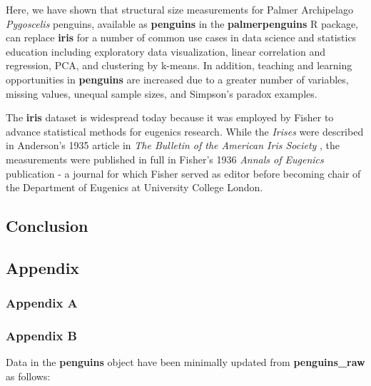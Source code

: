 Here, we have shown that structural size measurements for Palmer
Archipelago \emph{Pygoscelis} penguins, available as \textbf{penguins}
in the \textbf{palmerpenguins} R package, can replace \textbf{iris} for
a number of common use cases in data science and statistics education
including exploratory data visualization, linear correlation and
regression, PCA, and clustering by k-means. In addition, teaching and
learning opportunities in \textbf{penguins} are increased due to a
greater number of variables, missing values, unequal sample sizes, and
Simpson's paradox examples.

The \textbf{iris} dataset is widespread today because it was employed by
Fisher to advance statistical methods for eugenics research. While the
\emph{Irises} were described in Anderson's 1935 article in \emph{The
Bulletin of the American Iris Society} \citep{anderson_irises_1935}, the
measurements were published in full in Fisher's 1936 \emph{Annals of
Eugenics} publication \citep{fisher_use_1936} - a journal for which
Fisher served as editor before becoming chair of the Department of
Eugenics at University College London.

\hypertarget{conclusion}{%
\subsection{Conclusion}\label{conclusion}}

\hypertarget{appendix}{%
\subsection{Appendix}\label{appendix}}

\hypertarget{appendix-a}{%
\subsubsection{Appendix A}\label{appendix-a}}

\hypertarget{appendix-b}{%
\subsubsection{Appendix B}\label{appendix-b}}

Data in the \textbf{penguins} object have been minimally updated from
\textbf{penguins\_raw} as follows:

